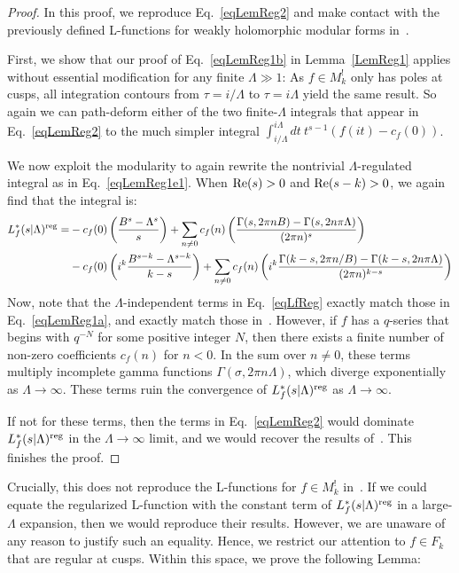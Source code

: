 \documentclass[11pt,a4paper]{article}
\newcommand{\G}{\Gamma}
\newcommand{\La}{\Lambda}
\newcommand{\s}{\sigma}
\newcommand{\reg}{{\rm reg}}
\begin{document}
\begin{proof}
In this proof, we reproduce Eq.~\eqref{eqLemReg2} and make contact with the previously defined L-functions for weakly holomorphic modular forms in~\cite{03-BFI, 04-BFK, 05-BFK2}. 

First, we show that our proof of Eq.~\eqref{eqLemReg1b} in Lemma~\ref{LemReg1} applies without essential modification for any finite $\La \gg 1$: As $f \in M_k^!$ only has poles at cusps, all integration contours from $\tau = i/\Lambda$ to $\tau = i\Lambda$ yield the same result. So again we can path-deform either of the two finite-$\Lambda$ integrals that appear in Eq.~\eqref{eqLemReg2} to the much simpler integral $\int_{i/\Lambda}^{i \Lambda} dt ~t^{s-1} (f(it)-c_f(0))$. 

We now exploit the modularity to again rewrite the nontrivial $\La$-regulated integral as in Eq.~\eqref{eqLemReg1e1}. When ${\rm Re}(s) > 0$ and ${\rm Re}(s-k) > 0$, we again find that the integral is: 
\begin{align}
\label{eqLfReg}
L_f^*(s|\Lambda)^\reg =
&
-c_f(0) \left( \frac{B^{s}-\La^{s}}{s}\right) 
+ \sum_{n \neq 0} c_f(n) \left(\frac{\G(s,2\pi n B)-\G(s, 2 n \pi \La)}{(2\pi n)^s} \right)
\\
&
-c_f(0) \left( i^k  \frac{B^{s-k}-\La^{s-k}}{k-s}\right) 
+ \sum_{n \neq 0} c_f(n) \left(i^k \frac{\G(k-s,2\pi n/B)-\G(k-s, 2 n \pi \La)}{(2\pi n)^{k-s}} \right) \nonumber
\end{align}
Now, note that the $\La$-independent terms in Eq.~\eqref{eqLfReg} exactly match those in Eq.~\eqref{eqLemReg1a}, and exactly match those in~\cite{04-BFK, 05-BFK2}. However, if $f$ has a $q$-series that begins with $q^{-N}$ for some positive integer $N$, then there exists a finite number of non-zero coefficients $c_f(n)$ for $n < 0$. In the sum over $n \neq 0$, these terms multiply incomplete gamma functions $\G(\s,2 \pi n \La)$, which diverge exponentially as $\La \to \infty$. These terms ruin the convergence of $L_f^*(s|\La)^\reg$ as $\La \to \infty$.

If not for these terms, then the terms in Eq.~\eqref{eqLemReg2} would dominate $L_f^*(s|\La)^\reg$ in the $\La \to \infty$ limit, and we would recover the results of~\cite{04-BFK, 05-BFK2}. This finishes the proof.
\end{proof}

Crucially, this does not reproduce the L-functions for $f \in M_k^!$ in~\cite{03-BFI, 04-BFK, 05-BFK2}. If we could equate the regularized L-function with the constant term of $L_f^*(s|\La)^\reg$ in a large-$\La$ expansion, then we would reproduce their results. However, we are unaware of any reason to justify such an equality. Hence, we restrict our attention to $f \in F_k$ that are regular at cusps. Within this space, we prove the following Lemma: 
\end{document}
